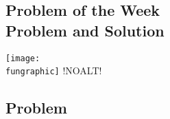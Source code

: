 \usepackage{amsmath,amssymb,amsfonts,array, color,epic,graphicx,fancyhdr,comment}
\usepackage[T1]{fontenc}
\usepackage{xstring, etoolbox, pdftexcmds,enumerate}%

\setlength{\topmargin}{-0.65in}
\setlength{\headheight}{0.5in}
\setlength{\headsep}{0.15in}
\setlength{\textheight}{9.4in}
\setlength{\footskip}{0in}

\addtolength{\oddsidemargin}{-48pt} %
\setlength{\textwidth}{17.2cm}
\setlength{\marginparsep}{0cm}
\setlength{\marginparwidth}{0cm}


\setlength{\parskip}{2mm} 

\pagestyle{fancy}
\renewcommand{\headrulewidth}{0pt} %




\begin{center}
\section{Problem of the Week \\ Problem \problemlevel{} and Solution}
\end{center}

\begin{center}
	\texttt{[image: \\fungraphic]}
	!NOALT!
	\fungraphiccaption
\end{center}


\begin{flushleft}
\smtext
{
\subsection{Problem}
\problembody
}%
	{}
	{\vspace{5mm}}

\end{flushleft}


